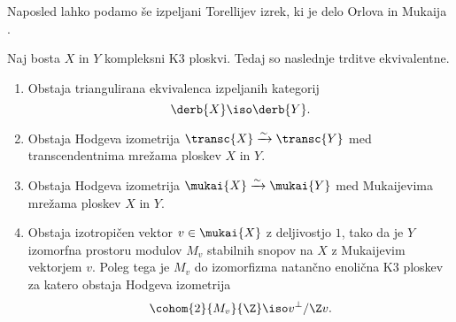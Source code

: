 Naposled lahko podamo še izpeljani Torellijev izrek, ki je delo Orlova \cite{Orlov2003} in Mukaija \cite{Mukai1987}.

\begin{izrek}
    \emph{\cite{Orlov2003,Mukai1987}}
    Naj bosta $X$ in $Y$ kompleksni K3 ploskvi. Tedaj so naslednje trditve ekvivalentne. 
    \begin{enumerate}[label = (\roman*)]
        \item Obstaja triangulirana ekvivalenca izpeljanih kategorij 
        \[
            \derb{X} \iso \derb{Y}.
        \]
        \item Obstaja Hodgeva izometrija $\transc{X} \xrightarrow{\sim} \transc{Y}$ med transcendentnima mrežama ploskev $X$ in $Y$.
        \item Obstaja Hodgeva izometrija $\mukai{X} \xrightarrow{\sim} \mukai{Y}$ med Mukaijevima mrežama ploskev $X$ in $Y$. 
        \item Obstaja izotropičen vektor $v \in \mukai{X}$ z deljivostjo $1$, tako da je $Y$ izomorfna prostoru modulov $M_v$ stabilnih snopov na $X$ z Mukaijevim vektorjem $v$. Poleg tega je $M_v$ do izomorfizma natančno enolična K3 ploskev za katero obstaja Hodgeva izometrija 
        \[
            \cohom{2}{M_v}{\Z} \iso v^\perp / \Z v.  
        \]
    \end{enumerate}
\end{izrek}